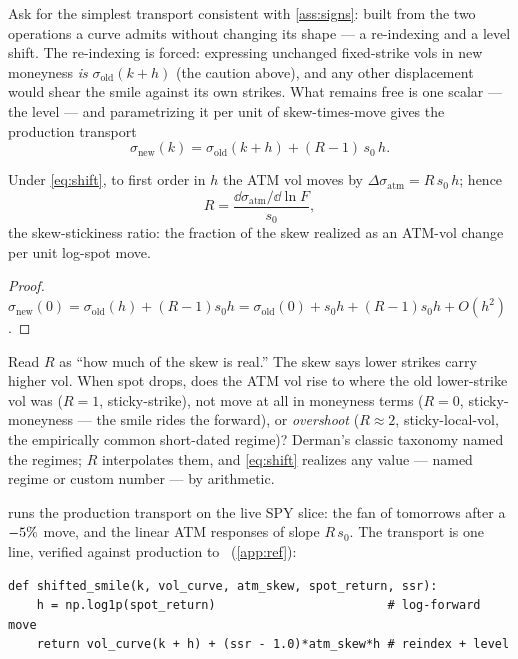 \documentclass[11pt]{article}
\begin{document}
Ask for the simplest transport consistent with
\cref{ass:signs}: built from the two operations a curve admits without
changing its shape --- a re-indexing and a level shift.  The
re-indexing is forced: expressing unchanged fixed-strike vols in new
moneyness \emph{is} $\sigma_{\mathrm{old}}(k+h)$ (the caution above),
and any other displacement would shear the smile against its own
strikes.  What remains free is one scalar --- the level --- and
parametrizing it per unit of skew-times-move gives the production
transport
\begin{equation}
\boxed{\;\sigma_{\mathrm{new}}(k)
=\sigma_{\mathrm{old}}(k+h)+(R-1)\,s_0\,h .\;}
\label{eq:shift}
\end{equation}

\begin{proposition}
\label{prop:atm}
Under \eqref{eq:shift}, to first order in $h$ the ATM vol moves by
$\Delta\sigma_{\mathrm{atm}}=R\,s_0\,h$; hence
\[
R=\frac{\dd\sigma_{\mathrm{atm}}/\dd\ln F}{s_0},
\]
the skew-stickiness ratio: the fraction of the skew realized as an
ATM-vol change per unit log-spot move.
\end{proposition}

\begin{proof}
$\sigma_{\mathrm{new}}(0)=\sigma_{\mathrm{old}}(h)+(R-1)s_0h
=\sigma_{\mathrm{old}}(0)+s_0h+(R-1)s_0h+O(h^{2})$.
\end{proof}

\begin{heuristic}
Read $R$ as ``how much of the skew is real.''  The skew says lower
strikes carry higher vol.  When spot drops, does the ATM vol rise to
where the old lower-strike vol was ($R=1$, sticky-strike), not move at
all in moneyness terms ($R=0$, sticky-moneyness --- the smile rides the
forward), or \emph{overshoot} ($R\approx2$, sticky-local-vol, the
empirically common short-dated regime)?  Derman's classic taxonomy
\cite{Derman1999} named the regimes; $R$ interpolates them, and
\eqref{eq:shift} realizes any value --- named regime or custom number
--- by arithmetic.
\end{heuristic}

 runs the production transport on the live SPY slice: the
fan of tomorrows after a $-5\%$ move, and the linear ATM
responses of slope $R\,s_0$.  The transport is one line, verified
against production to \smdrefagree\ (\cref{app:ref}):

\begin{lstlisting}[caption={The SSR smile transport \eqref{eq:shift}
(distilled from \texttt{dynamics/ssr.py}; production's last argument
accepts a named regime or a numeric $R$).},label={lst:ssr}]
def shifted_smile(k, vol_curve, atm_skew, spot_return, ssr):
    h = np.log1p(spot_return)                        # log-forward move
    return vol_curve(k + h) + (ssr - 1.0)*atm_skew*h # reindex + level
\end{lstlisting}
\end{document}
